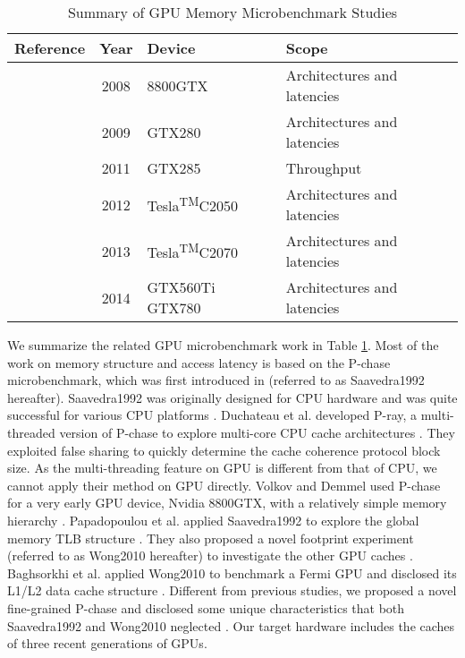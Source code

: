 \documentclass[10pt,journal,compsoc]{IEEEtran}
\theoremstyle{definition}
\begin{document}
\begin{table}
\renewcommand{\arraystretch}{1.2}
\centering
\caption {Summary of GPU Memory Microbenchmark Studies}
\label{tab:literatureReview}
\begin{tabular}
 {|c|c|m{0.68in}|m{1.35in}|}  \hline
  Reference & Year & Device & Scope \\ \hline
  \cite{volkov2008benchmarking} & 2008 & 8800GTX & Architectures and latencies \\
  \hline
  \cite{papadopoulou2009micro,wong2010demystifying} & 2009 & GTX280 & Architectures and latencies \\
  \hline
  \cite{zhang2011quantitative} &2011 &GTX285 &Throughput \\
  \hline
  \cite{baghsorkhi2012efficient} &2012 &Tesla\textsuperscript{TM}C2050&Architectures and latencies \\
  \hline
  \cite{meltzer2013micro} & 2013 & Tesla\textsuperscript{TM}C2070 &Architectures and latencies\\ \hline
  \cite{mei2014benchmarking} & 2014 &GTX560Ti GTX780 &Architectures and latencies \\ \hline
\end{tabular}
\end{table}

We summarize the related GPU microbenchmark work in Table \ref{tab:literatureReview}. Most of the work on memory structure and access latency is based on the P-chase microbenchmark, which was first introduced in \cite{saavedra1992cpu, saavedra1995measuring} (referred to as Saavedra1992 hereafter). Saavedra1992 was originally designed for CPU hardware and was quite successful for various CPU platforms \cite{mcvoy1996lmbench}. Duchateau et al. developed P-ray, a multi-threaded version of P-chase to explore multi-core CPU cache architectures \cite{duchateau2008p-ray}. They exploited false sharing to quickly determine the cache coherence protocol block size. As the multi-threading feature on GPU is different from that of CPU, we cannot apply their method on GPU directly. Volkov and Demmel used P-chase for a very early GPU device, Nvidia 8800GTX, with a relatively simple memory hierarchy \cite{volkov2008benchmarking}. Papadopoulou et al. applied Saavedra1992 to explore the global memory TLB structure \cite{papadopoulou2009micro}. They also proposed a novel footprint experiment (referred to as Wong2010 hereafter) to investigate the other GPU caches \cite{wong2010demystifying}. Baghsorkhi et al. applied Wong2010 to benchmark a Fermi GPU and disclosed its L1/L2 data cache structure \cite{baghsorkhi2012efficient}. Different from previous studies, we proposed a novel fine-grained P-chase and disclosed some unique characteristics that both Saavedra1992 and Wong2010 neglected \cite{mei2014benchmarking}. Our target hardware includes the caches of three recent generations of GPUs.
\end{document}
